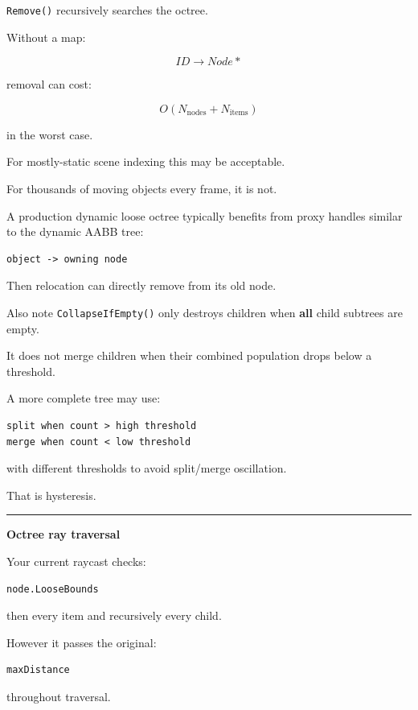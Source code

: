 \texttt{Remove()} recursively searches the octree.

Without a map:

\[
ID\rightarrow Node*
\]

removal can cost:

\[
O(N_{\text{nodes}}+N_{\text{items}})
\]

in the worst case.

For mostly-static scene indexing this may be acceptable.

For thousands of moving objects every frame, it is not.

A production dynamic loose octree typically benefits from proxy handles similar to the dynamic AABB tree:

\begin{verbatim}
object -> owning node
\end{verbatim}

Then relocation can directly remove from its old node.

Also note \texttt{CollapseIfEmpty()} only destroys children when \textbf{all} child subtrees are empty.

It does not merge children when their combined population drops below a threshold.

A more complete tree may use:

\begin{verbatim}
split when count > high threshold
merge when count < low threshold
\end{verbatim}

with different thresholds to avoid split/merge oscillation.

That is hysteresis.

\begin{center}\rule{0.5\linewidth}{0.5pt}\end{center}

\textbf{Octree ray traversal}

Your current raycast checks:

\begin{verbatim}
node.LooseBounds
\end{verbatim}

then every item and recursively every child.

However it passes the original:

\begin{verbatim}
maxDistance
\end{verbatim}

throughout traversal.

